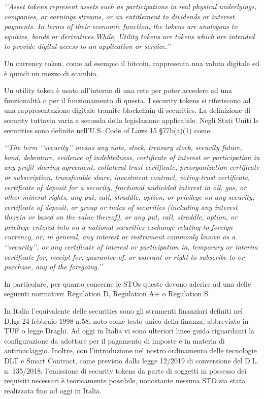 \textit{‘‘Asset tokens represent assets such as participations in real physical underlyings, companies, or earnings streams, or an entitlement to dividends or interest payments. In terms of their economic function, the tokens are analogous to equities, bonds or derivatives.While, Utility tokens are tokens which are intended to provide digital access to an application or service.’’}


Un currency token, come ad esempio il bitcoin, rappresenta una valuta digitale ed è quindi un mezzo di scambio.

Un utility token è usato all'interno di una rete per poter accedere ad una funzionalità o per il funzionamento di questa. 
I security tokens si riferiscono ad una rappresentazione digitale tramite blockchain di securities. La definizione di security tuttavia varia a seconda della legislazione applicabile.
Negli Stati Uniti le securities sono definite nell'U.S. Code of Laws 15 §77b(a)(1) come:

\textit{‘‘The term ‘‘security’’ means any note, stock, treasury stock, security future, bond, debenture, evidence of indebtedness, certificate of interest or participation in any profit sharing agreement, collateral-trust certificate, preorganization certificate or subscription, transferable share, investment contract, voting-trust certificate, certificate of deposit for a security, fractional undivided interest in oil, gas, or other mineral rights, any put, call, straddle, option, or privilege on any security, certificate of deposit, or group or index of securities (including any interest therein or based on the value thereof), or any put, call, straddle, option, or privilege entered into on a national securities exchange relating to foreign currency, or, in general, any interest or instrument commonly known as a ‘‘security’’, or any certificate of interest or participation in, temporary or interim certificate for, receipt for, guarantee of, or warrant or right to subscribe to or purchase, any of the foregoing.’’}

In particolare, per quanto concerne le STOs queste devono aderire ad una delle seguenti normative: Regulation D, Regulation A+ o Regulation S\cite{K31,K32,K33}. 

In Italia l'equivalente delle securities sono gli strumenti finanziari definiti nel D.lgs 24 febbraio 1998 n.58, noto come testo unico della finanza, abbreviato in TUF o legge Draghi\cite{K34}. Ad oggi in Italia vi sono ulteriori linee guida riguardanti la configurazione da adottare per il pagamento di imposte e in materia di antiriciclaggio. Inoltre, con l'introduzione nel nostro ordinamento delle tecnologie DLT e Smart Contract, come previsto dalla legge 12/2019 di conversione del D.L. n. 135/2018, l'emissione di security tokens da parte di soggetti in possesso dei requisiti necessari è teoricamente possibile, nonostante nessuna STO sia stata realizzata fino ad oggi in Italia.

